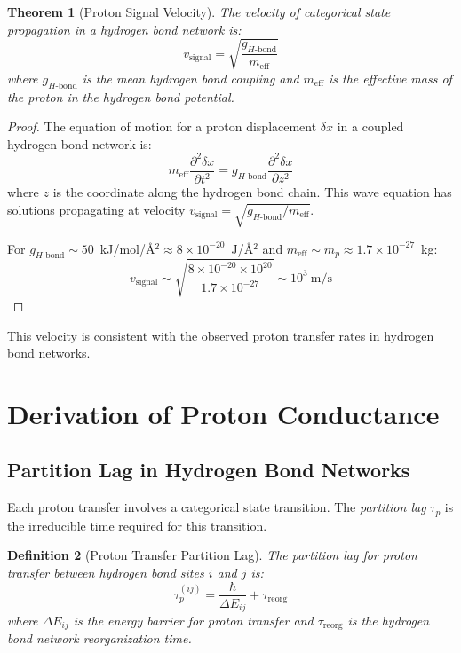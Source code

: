\documentclass[twocolumn,showpacs,preprintnumbers,amsmath,amssymb,prd]{revtex4-2}
\newtheorem{theorem}{Theorem}[section]
\newtheorem{definition}[theorem]{Definition}
\newcommand{\taup}{\tau_p}
\newcommand{\Hbond}{H\text{-bond}}
\begin{document}
\begin{theorem}[Proton Signal Velocity]
\label{thm:proton_signal}
The velocity of categorical state propagation in a hydrogen bond network is:
\begin{equation}
v_{\text{signal}} = \sqrt{\frac{g_{\Hbond}}{m_{\text{eff}}}}
\label{eq:proton_signal_velocity}
\end{equation}
where $g_{\Hbond}$ is the mean hydrogen bond coupling and $m_{\text{eff}}$ is the effective mass of the proton in the hydrogen bond potential.
\end{theorem}

\begin{proof}
The equation of motion for a proton displacement $\delta x$ in a coupled hydrogen bond network is:
\begin{equation}
m_{\text{eff}} \frac{\partial^2 \delta x}{\partial t^2} = g_{\Hbond} \frac{\partial^2 \delta x}{\partial z^2}
\label{eq:proton_wave}
\end{equation}
where $z$ is the coordinate along the hydrogen bond chain. This wave equation has solutions propagating at velocity $v_{\text{signal}} = \sqrt{g_{\Hbond}/m_{\text{eff}}}$.

For $g_{\Hbond} \sim 50$~kJ/mol/\AA$^2 \approx 8 \times 10^{-20}$~J/\AA$^2$ and $m_{\text{eff}} \sim m_p \approx 1.7 \times 10^{-27}$~kg:
\begin{equation}
v_{\text{signal}} \sim \sqrt{\frac{8 \times 10^{-20} \times 10^{20}}{1.7 \times 10^{-27}}} \sim 10^3~\text{m/s}
\end{equation}
\end{proof}

This velocity is consistent with the observed proton transfer rates in hydrogen bond networks.


\section{Derivation of Proton Conductance}
\label{sec:conductance}

\subsection{Partition Lag in Hydrogen Bond Networks}

Each proton transfer involves a categorical state transition. The \emph{partition lag} $\taup$ is the irreducible time required for this transition.

\begin{definition}[Proton Transfer Partition Lag]
\label{def:proton_partition_lag}
The partition lag for proton transfer between hydrogen bond sites $i$ and $j$ is:
\begin{equation}
\taup^{(ij)} = \frac{\hbar}{\Delta E_{ij}} + \tau_{\text{reorg}}
\label{eq:proton_partition_lag}
\end{equation}
where $\Delta E_{ij}$ is the energy barrier for proton transfer and $\tau_{\text{reorg}}$ is the hydrogen bond network reorganization time.
\end{definition}
\end{document}
